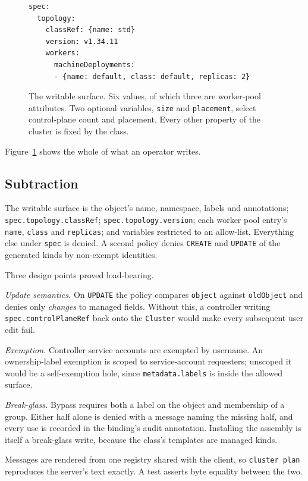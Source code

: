 \documentclass[conference]{IEEEtran}
\begin{document}
\begin{figure}[t]
\begin{lstlisting}
spec:
  topology:
    classRef: {name: std}
    version: v1.34.11
    workers:
      machineDeployments:
      - {name: default, class: default, replicas: 2}
\end{lstlisting}
\caption{The writable surface. Six values, of which three are worker-pool
attributes. Two optional variables, \texttt{size} and \texttt{placement}, select
control-plane count and placement. Every other property of the cluster is fixed by
the class.}
\label{fig:six}
\end{figure}

Figure~\ref{fig:six} shows the whole of what an operator writes.

\subsection{Subtraction}
\label{sec:subtraction}

The writable surface is the object's name, namespace, labels and annotations;
\texttt{spec.topology.classRef}; \texttt{spec.topology.version}; each worker pool
entry's \texttt{name}, \texttt{class} and \texttt{replicas}; and variables
restricted to an allow-list. Everything else under \texttt{spec} is denied. A second policy denies
\texttt{CREATE} and \texttt{UPDATE} of the generated kinds by non-exempt
identities.

Three design points proved load-bearing.

\emph{Update semantics.} On \texttt{UPDATE} the policy compares \texttt{object}
against \texttt{oldObject} and denies only \emph{changes} to managed fields.
Without this, a controller writing \texttt{spec.controlPlaneRef} back onto the
\texttt{Cluster} would make every subsequent user edit fail.

\emph{Exemption.} Controller service accounts are exempted by username. An
ownership-label exemption is scoped to service-account requesters; unscoped it
would be a self-exemption hole, since \texttt{metadata.labels} is inside the
allowed surface.

\emph{Break-glass.} Bypass requires both a label on the object and membership of a
group. Either half alone is denied with a message naming the missing half, and
every use is recorded in the binding's audit annotation. Installing the assembly
is itself a break-glass write, because the class's templates are managed kinds.

Messages are rendered from one registry shared with the client, so
\texttt{cluster plan} reproduces the server's text exactly. A test asserts byte
equality between the two.
\end{document}
